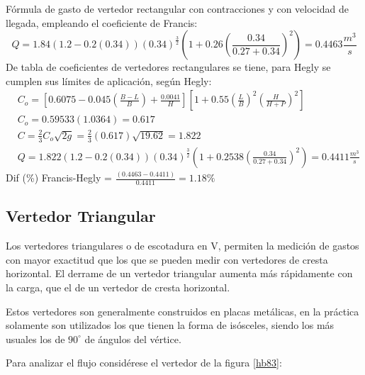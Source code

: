 Fórmula de gasto de vertedor rectangular con contracciones y con velocidad de llegada, empleando el coeficiente de Francis:
\begin{equation*}
    Q = 1.84(1.2 - 0.2(0.34))\left(0.34\right)^{\frac{3}{2}}\left(1 + 0.26\left(\frac{0.34}{0.27 + 0.34}\right)^2\right) =0.4463 \frac{m^3}{s}
\end{equation*}
De tabla de coeficientes de vertedores rectangulares se tiene, para Hegly se cumplen sus límites de aplicación, según Hegly:
\begin{align*}
    &C_o =\left[0.6075 -0.045\left(\frac{B - L}{B}\right) + \frac{0.0041}{H}\right]\left[1+ 0.55\left(\frac{L}{B}\right)^2\left(\frac{H}{H + P}\right)^2\right]\\ 
    &C_o = 0.59533(1.0364) =0.617\\
    &C = \frac{2}{3} C_o \sqrt{2g} = \frac{2}{3}(0.617)\sqrt{19.62} = 1.822\\
    &Q = 1.822(1.2 - 0.2(0.34))\left(0.34\right)^{\frac{3}{2}}\left(1 + 0.2538\left(\frac{0.34}{0.27 + 0.34}\right)^2\right) = 0.4411 \frac{m^3}{s}
\end{align*}
Dif (\%) Francis-Hegly = $\frac{\left(0.4463-0.4411\right)}{0.4411}=1.18\%$

\subsection{Vertedor Triangular}

Los vertedores triangulares o de escotadura en V, permiten la medición de gastos con mayor exactitud que los que se pueden medir con vertedores de cresta horizontal. El derrame de un vertedor triangular aumenta más rápidamente con la carga, que el de un vertedor de cresta horizontal.

Estos vertedores son generalmente construidos en placas metálicas, en la práctica solamente son utilizados los que tienen la forma de isósceles, siendo los más usuales los de $90^{\circ}$ de ángulos del vértice.

Para analizar el flujo considérese el vertedor de la figura \ref{hb83}:

